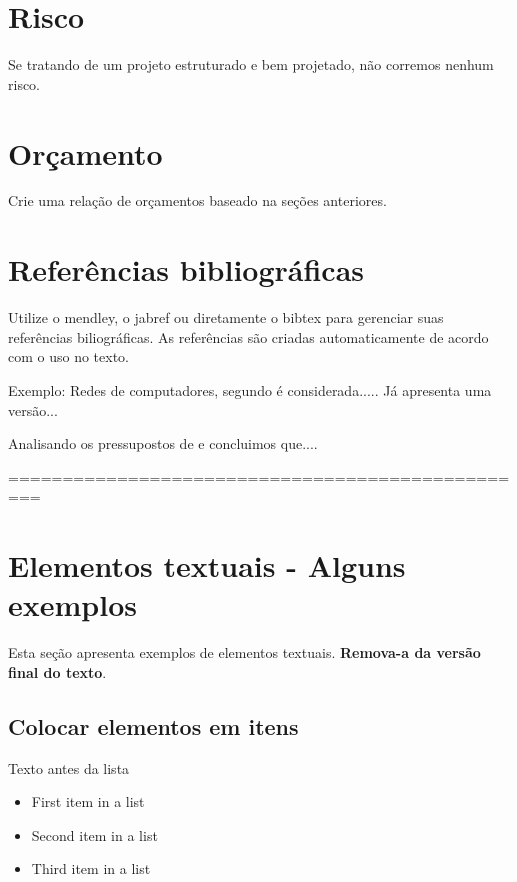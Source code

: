 \documentclass[	DIV=calc,%
							paper=a4,%
							fontsize=12pt,%
							onecolumn]{scrartcl}	 					%
\begin{document}
\section{Risco}
Se tratando de um projeto estruturado e bem projetado, não corremos nenhum risco. 

\section{Orçamento}
Crie uma relação de orçamentos baseado na seções anteriores.


\section{Referências bibliográficas}
Utilize o mendley, o jabref ou diretamente o bibtex para gerenciar suas referências biliográficas. As referências são criadas automaticamente de acordo com o uso no texto.

Exemplo: Redes de computadores, segundo \cite{t2013} é considerada..... Já \cite{kurose2010} apresenta uma versão...

Analisando os pressupostos de \cite{ref3} e \cite{ref4} concluimos que....


\renewcommand\refname{} %

  

=================================================
\section{Elementos textuais - Alguns exemplos}

Esta seção apresenta exemplos de elementos textuais. \textbf{Remova-a da versão final do texto}.


\subsection{Colocar elementos em itens}

Texto antes da lista

\begin{itemize}
	\item First item in a list 
	\item Second item in a list 
	\item Third item in a list
\end{itemize}
\end{document}
